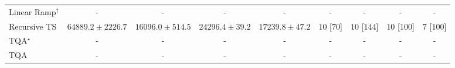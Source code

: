 \begin{tabular}{l|cccc|cccc|}
Linear Ramp$^\dagger$ & {\cellcolor[HTML]{000000}} \color[HTML]{F1F1F1} {\cellcolor{white}} \color{black} - & {\cellcolor[HTML]{000000}} \color[HTML]{F1F1F1} {\cellcolor{white}} \color{black} - & {\cellcolor[HTML]{000000}} \color[HTML]{F1F1F1} {\cellcolor{white}} \color{black} - & {\cellcolor[HTML]{000000}} \color[HTML]{F1F1F1} {\cellcolor{white}} \color{black} - & {\cellcolor[HTML]{000000}} \color[HTML]{F1F1F1} {\cellcolor{white}} \color{black} - & {\cellcolor[HTML]{000000}} \color[HTML]{F1F1F1} {\cellcolor{white}} \color{black} - & {\cellcolor[HTML]{000000}} \color[HTML]{F1F1F1} {\cellcolor{white}} \color{black} - & {\cellcolor[HTML]{000000}} \color[HTML]{F1F1F1} {\cellcolor{white}} \color{black} - \\
Recursive TS & {\cellcolor[HTML]{873696}} \color[HTML]{F1F1F1} $64889.2\pm 2226.7$ & {\cellcolor[HTML]{F0F7FA}} \color[HTML]{000000} $16096.0\pm 514.5$ & {\cellcolor[HTML]{D6E4F0}} \color[HTML]{000000} $24296.4\pm 39.2$ & {\cellcolor[HTML]{ECF4F9}} \color[HTML]{000000} $17239.8\pm 47.2$ & {\cellcolor[HTML]{49006A}} \color[HTML]{F1F1F1} $10$ [$70$] & {\cellcolor[HTML]{49006A}} \color[HTML]{F1F1F1} $10$ [$144$] & {\cellcolor[HTML]{49006A}} \color[HTML]{F1F1F1} $10$ [$100$] & {\cellcolor[HTML]{CD238F}} \color[HTML]{F1F1F1} $7$ [$100$] \\
TQA$^\star$ & {\cellcolor[HTML]{000000}} \color[HTML]{F1F1F1} {\cellcolor{white}} \color{black} - & {\cellcolor[HTML]{000000}} \color[HTML]{F1F1F1} {\cellcolor{white}} \color{black} - & {\cellcolor[HTML]{000000}} \color[HTML]{F1F1F1} {\cellcolor{white}} \color{black} - & {\cellcolor[HTML]{000000}} \color[HTML]{F1F1F1} {\cellcolor{white}} \color{black} - & {\cellcolor[HTML]{000000}} \color[HTML]{F1F1F1} {\cellcolor{white}} \color{black} - & {\cellcolor[HTML]{000000}} \color[HTML]{F1F1F1} {\cellcolor{white}} \color{black} - & {\cellcolor[HTML]{000000}} \color[HTML]{F1F1F1} {\cellcolor{white}} \color{black} - & {\cellcolor[HTML]{000000}} \color[HTML]{F1F1F1} {\cellcolor{white}} \color{black} - \\
TQA & {\cellcolor[HTML]{000000}} \color[HTML]{F1F1F1} {\cellcolor{white}} \color{black} - & {\cellcolor[HTML]{000000}} \color[HTML]{F1F1F1} {\cellcolor{white}} \color{black} - & {\cellcolor[HTML]{000000}} \color[HTML]{F1F1F1} {\cellcolor{white}} \color{black} - & {\cellcolor[HTML]{000000}} \color[HTML]{F1F1F1} {\cellcolor{white}} \color{black} - & {\cellcolor[HTML]{000000}} \color[HTML]{F1F1F1} {\cellcolor{white}} \color{black} - & {\cellcolor[HTML]{000000}} \color[HTML]{F1F1F1} {\cellcolor{white}} \color{black} - & {\cellcolor[HTML]{000000}} \color[HTML]{F1F1F1} {\cellcolor{white}} \color{black} - & {\cellcolor[HTML]{000000}} \color[HTML]{F1F1F1} {\cellcolor{white}} \color{black} - \\

\end{tabular}
